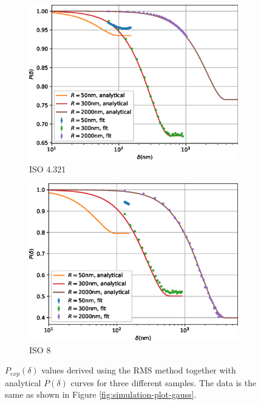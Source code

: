 \documentclass{article}
\begin{document}
\begin{figure}[p]
\begin{subfigure}[b]{0.45\textwidth}
		\includegraphics[width=\textwidth]{simulation-plot-rms-ISO-4.321}
		\caption{ISO 4.321}
		\label{fig:simulation-plot-rms-ISO-4.321}
	\end{subfigure}
	\hfill
	\begin{subfigure}[b]{0.45\textwidth}
		\centering
		\includegraphics[width=\textwidth]{simulation-plot-rms-ISO-8}
		\caption{ISO 8}
		\label{fig:simulation-plot-rms-ISO-8}
	\end{subfigure}
	\caption{$P_{exp}(\delta)$ values derived using the RMS method together with analytical $P(\delta)$ curves for three different samples. The data is the same as shown in Figure \ref{fig:simulation-plot-gauss}.}
	\label{fig:simulation-plot-rms}
\end{figure}
\end{document}
